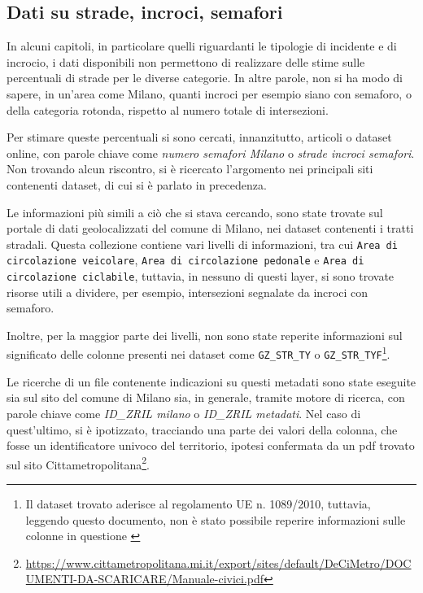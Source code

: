 \documentclass[a4paper]{report}
\newcommand{\columnstyle}[1]{\texttt{#1}}
\newcommand{\quotestyle}[1]{\textit{#1}}
\begin{document}
\subsection{Dati su strade, incroci, semafori}

In alcuni capitoli, in particolare quelli riguardanti le tipologie di incidente e 
di incrocio, i dati disponibili non permettono di realizzare delle stime sulle 
percentuali di strade per le diverse categorie. 
In altre parole, non si ha modo di sapere, in un'area come Milano, quanti incroci 
per esempio siano con semaforo, o della categoria rotonda, 
rispetto al numero totale di intersezioni. 

Per stimare queste percentuali si sono cercati, innanzitutto, articoli o dataset online, con 
parole chiave come \quotestyle{numero semafori Milano} o \quotestyle{strade incroci semafori}. 
Non trovando alcun riscontro, si è ricercato l'argomento nei principali siti contenenti 
dataset, di cui si è parlato in precedenza. 

Le informazioni più simili a ciò che si stava cercando, 
sono state trovate sul portale di dati geolocalizzati 
del comune di Milano, nei dataset contenenti i tratti stradali. 
Questa collezione contiene vari livelli di informazioni, tra cui 
\columnstyle{Area di circolazione veicolare}, 
\columnstyle{Area di circolazione pedonale} e \columnstyle{Area di circolazione ciclabile}, 
tuttavia, in nessuno di questi layer, si sono trovate risorse utili a dividere, 
per esempio, intersezioni segnalate da incroci con semaforo. 

Inoltre, per la maggior parte dei livelli, non sono state reperite informazioni 
sul significato delle colonne presenti nei dataset come \columnstyle{GZ\_STR\_TY} o 
\columnstyle{GZ\_STR\_TYF}\footnote{Il dataset trovato aderisce al regolamento UE n. 1089/2010, 
tuttavia, leggendo questo documento, non è stato possibile reperire informazioni sulle colonne 
in questione \cite{REGOLAMENTOUE:1}}. 

Le ricerche di un file contenente indicazioni su questi metadati sono state eseguite sia 
sul sito del comune di Milano sia, in generale, tramite motore di ricerca, con parole chiave 
come \quotestyle{ID\_ZRIL milano} o \quotestyle{ID\_ZRIL metadati}. 
Nel caso di quest'ultimo, si è ipotizzato, tracciando una parte dei valori della colonna, 
che fosse un identificatore univoco del territorio, ipotesi confermata 
da un pdf trovato sul sito 
Cittametropolitana\footnote{\url{https://www.cittametropolitana.mi.it/export/sites/default/DeCiMetro/DOCUMENTI-DA-SCARICARE/Manuale-civici.pdf}}. 
\end{document}
